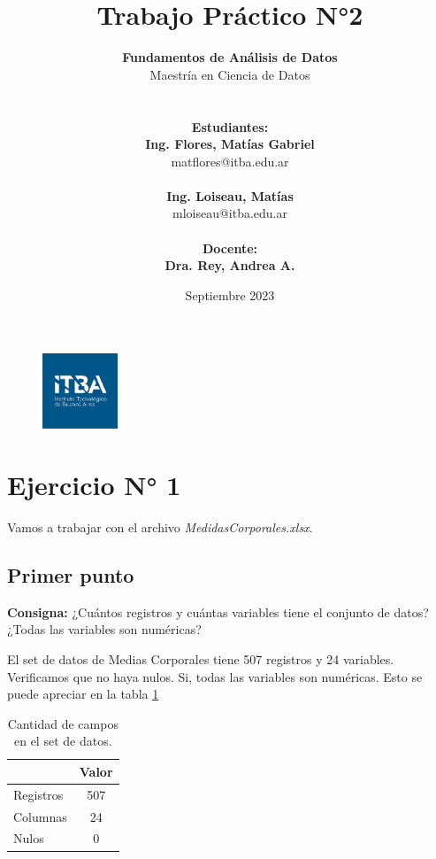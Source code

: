 \documentclass{article} %
\title{Trabajo Práctico N°2} %
\date{Septiembre 2023} %
\author{
	\textbf{Fundamentos de Análisis de Datos}\\
	Maestría en Ciencia de Datos\\
	\\~\\
	\textbf{Estudiantes: }\\
	\textbf{Ing. Flores, Matías Gabriel}\\
	matflores@itba.edu.ar
 	\\~\\
 	\textbf{Ing. Loiseau, Matías}\\
 	mloiseau@itba.edu.ar
 	\\~\\
	\textbf{Docente: }\\
	\textbf{Dra. Rey, Andrea A.}
}
\begin{document}

\begin{figure}
\centering
	\includegraphics[width=0.2\textwidth]{images/itba-logo}
	\label{fig:itba-logo}
\end{figure}
\maketitle %

\thispagestyle{empty} %
\cleardoublepage

\cleardoublepage
\tableofcontents %
\cleardoublepage


\section{Ejercicio N° 1}

Vamos a trabajar con el archivo \textit{MedidasCorporales.xlsx}.

\subsection{Primer punto}

\textbf{Consigna:} ¿Cuántos registros y cuántas variables tiene el conjunto de datos? ¿Todas las variables
son numéricas?

El set de datos de Medias Corporales tiene 507 registros y 24 variables. Verificamos que no haya nulos. Si, todas las variables son numéricas. Esto se puede apreciar en la tabla \ref{tab:table-punto-1-1}

\begin{table}[H]
	\centering
		\begin{tabular}{||l | c ||}
			\hline
			\hline
			 & Valor\\
			\hline			
			\hline
			Registros & 507\\
			\hline
			Columnas & 24\\
			\hline
			Nulos & 0 \\
			\hline
			\hline
		\end{tabular}
		\caption{Cantidad de campos en el set de datos.}
	\label{tab:table-punto-1-1}
\end{table}
\end{document}
